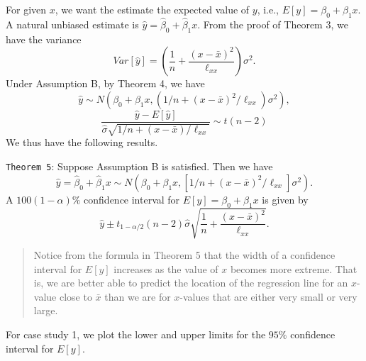 \documentclass[]{article}
\begin{document}
For given \(x\), we want the estimate the expected value of \(y\), i.e.,
\(E[y]=\beta_0+\beta_1x.\) A natural unbiased estimate is
\(\hat y = \hat\beta_0+\hat\beta_1x\). From the proof of Theorem 3, we
have the variance
\[Var[\hat y] = \left(\frac{1}{n}+\frac{(x-\bar x)^2}{\ell_{xx}}\right)\sigma^2.\]
Under Assumption B, by Theorem 4, we have
\[\hat y\sim N(\beta_0+\beta_1x,(1/n+(x-\bar x)^2/\ell_{xx})\sigma^2),\]
\[\frac{\hat y-E[\hat y]}{\hat{\sigma}\sqrt{1/n+(x-\bar x)/\ell_{xx}}}\sim t(n-2)\]
We thus have the following results.

\texttt{Theorem\ 5}: Suppose Assumption B is satisfied. Then we have
\[\hat y = \hat\beta_0+\hat\beta_1x \sim N(\beta_0+\beta_1x,[1/n+(x-\bar x)^2/\ell_{xx}]\sigma^2).\]
A \(100(1−\alpha)\%\) confidence interval for \(E[y]=\beta_0+\beta_1x\)
is given by
\[\hat y\pm t_{1-\alpha/2}(n-2)\hat{\sigma}\sqrt{\frac{1}{n}+\frac{(x-\bar x)^2}{\ell_{xx}}}.\]

\begin{quote}
Notice from the formula in Theorem 5 that the width of a confidence
interval for \(E[y]\) increases as the value of \(x\) becomes more
extreme. That is, we are better able to predict the location of the
regression line for an \(x\)-value close to \(\bar x\) than we are for
\(x\)-values that are either very small or very large.
\end{quote}

For case study 1, we plot the lower and upper limits for the \(95\%\)
confidence interval for \(E[y]\).
\end{document}
